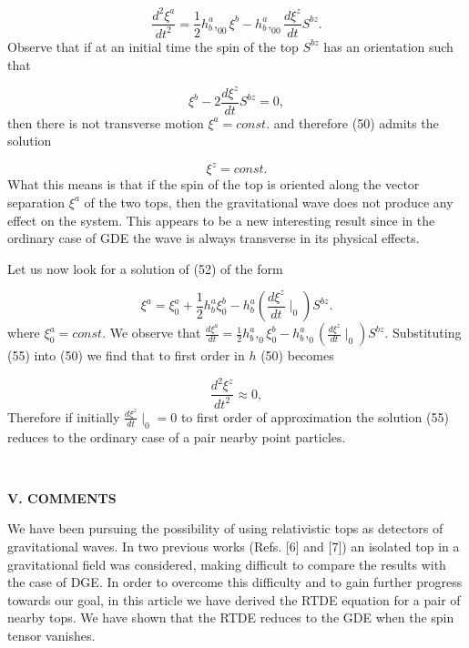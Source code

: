 \documentclass[a4paper,12pt]{article}
\begin{document}
\begin{equation}
\frac{d^{2}\xi ^{a}}{dt^{2}}=\frac{1}{2}h_{b}^{a},_{00}\xi
^{b}-h_{b}^{a},_{00}\frac{d\xi ^{z}}{dt}S^{bz}.  \label{52}
\end{equation}
Observe that if at an initial time the spin of the top $S^{bz}$ has an
orientation such that

\begin{equation}
\xi^{b}-2\frac{d\xi^{z}}{dt}S^{bz}=0,  \label{53}
\end{equation}
then there is not transverse motion $\xi^{a}=const.$ and therefore (50)
admits the solution

\begin{equation}
\xi ^{z}=const.  \label{54}
\end{equation}
What this means is that if the spin of the top is oriented along the vector
separation $\xi ^{a}$ of the two tops, then the gravitational wave does not
produce any effect on the system. This appears to be a new interesting
result since in the ordinary case of GDE the wave is always transverse in
its physical effects.

Let us now look for a solution of (52) of the form

\begin{equation}
\xi ^{a}=\xi _{0}^{a}+\frac{1}{2}h_{b}^{a}\xi _{0}^{b}-h_{b}^{a}(\frac{d\xi
^{z}}{dt}\mid _{0})S^{bz}.  \label{55}
\end{equation}
where $\xi _{0}^{a}=const$. We observe that $\frac{d\xi ^{a}}{dt}=\frac{1}{2}%
h_{b}^{a},_{0}\xi _{0}^{b}-h_{b}^{a},_{0}(\frac{d\xi ^{z}}{dt}\mid
_{0})S^{bz}$. Substituting (55) into (50) we find that to first order in $h$
(50) becomes

\begin{equation}
\frac{d^{2}\xi ^{z}}{dt^{2}}\approx 0,  \label{56}
\end{equation}
Therefore if initially $\frac{d\xi ^{z}}{dt}\mid _{0}=0$ to first order of
approximation the solution (55) reduces to the ordinary case of a pair
nearby point particles.

\bigskip \smallskip\ 

\noindent \textbf{V. COMMENTS}

\bigskip

We have been pursuing the possibility of using relativistic tops as
detectors of gravitational waves. In two previous works (Refs. [6] and [7])
an isolated top in a gravitational field was considered, making difficult to
compare the results with the case of DGE. In order to overcome this
difficulty and to gain further progress towards our goal, in this article we
have derived the RTDE equation for a pair of nearby tops. We have shown that
the RTDE reduces to the GDE when the spin tensor vanishes.
\end{document}
